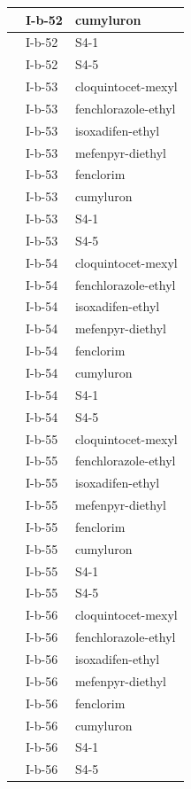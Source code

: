 \documentclass[11pt,a4paper]{article}
\begin{document}
\begin{table}[h]
\begin{tabular}{|l|l|l|}
 & I-b-52 & cumyluron \\ \hline
 & I-b-52 & S4-1 \\ \hline
 & I-b-52 & S4-5 \\ \hline
 & I-b-53 & cloquintocet-mexyl \\ \hline
 & I-b-53 & fenchlorazole-ethyl \\ \hline
 & I-b-53 & isoxadifen-ethyl \\ \hline
 & I-b-53 & mefenpyr-diethyl \\ \hline
 & I-b-53 & fenclorim \\ \hline
 & I-b-53 & cumyluron \\ \hline
 & I-b-53 & S4-1 \\ \hline
 & I-b-53 & S4-5 \\ \hline
 & I-b-54 & cloquintocet-mexyl \\ \hline
 & I-b-54 & fenchlorazole-ethyl \\ \hline
 & I-b-54 & isoxadifen-ethyl \\ \hline
 & I-b-54 & mefenpyr-diethyl \\ \hline
 & I-b-54 & fenclorim \\ \hline
 & I-b-54 & cumyluron \\ \hline
 & I-b-54 & S4-1 \\ \hline
 & I-b-54 & S4-5 \\ \hline
 & I-b-55 & cloquintocet-mexyl \\ \hline
 & I-b-55 & fenchlorazole-ethyl \\ \hline
 & I-b-55 & isoxadifen-ethyl \\ \hline
 & I-b-55 & mefenpyr-diethyl \\ \hline
 & I-b-55 & fenclorim \\ \hline
 & I-b-55 & cumyluron \\ \hline
 & I-b-55 & S4-1 \\ \hline
 & I-b-55 & S4-5 \\ \hline
 & I-b-56 & cloquintocet-mexyl \\ \hline
 & I-b-56 & fenchlorazole-ethyl \\ \hline
 & I-b-56 & isoxadifen-ethyl \\ \hline
 & I-b-56 & mefenpyr-diethyl \\ \hline
 & I-b-56 & fenclorim \\ \hline
 & I-b-56 & cumyluron \\ \hline
 & I-b-56 & S4-1 \\ \hline
 & I-b-56 & S4-5 \\ \hline

\end{tabular}
\end{table}
\end{document}
